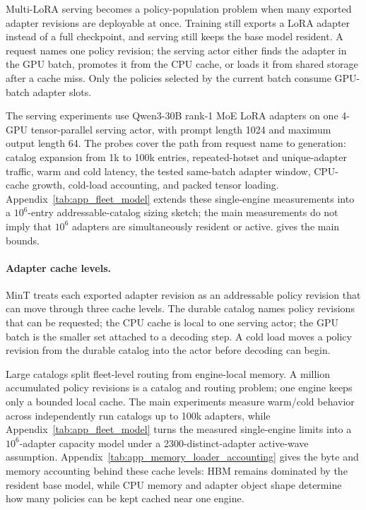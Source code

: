 \documentclass{llmxive}
\begin{document}
Multi-LoRA serving becomes a policy-population problem when many exported adapter revisions are deployable at once. Training still exports a LoRA adapter instead of a full checkpoint, and serving still keeps the base model resident. A request names one policy revision; the serving actor either finds the adapter in the GPU batch, promotes it from the CPU cache, or loads it from shared storage after a cache miss. Only the policies selected by the current batch consume GPU-batch adapter slots.

The serving experiments use Qwen3-30B rank-1 MoE LoRA adapters on one 4-GPU tensor-parallel serving actor, with prompt length 1024 and maximum output length 64. The probes cover the path from request name to generation: catalog expansion from 1k to 100k entries, repeated-hotset and unique-adapter traffic, warm and cold latency, the tested same-batch adapter window, CPU-cache growth, cold-load accounting, and packed tensor loading. Appendix~\cref{tab:app_fleet_model} extends these single-engine measurements into a $10^6$-entry addressable-catalog sizing sketch; the main measurements do not imply that $10^6$ adapters are simultaneously resident or active.  gives the main bounds.

\paragraph{Adapter cache levels.}
MinT treats each exported adapter revision as an addressable policy revision that can move through three cache levels. The durable catalog names policy revisions that can be requested; the CPU cache is local to one serving actor; the GPU batch is the smaller set attached to a decoding step. A cold load moves a policy revision from the durable catalog into the actor before decoding can begin.

Large catalogs split fleet-level routing from engine-local memory. A million accumulated policy revisions is a catalog and routing problem; one engine keeps only a bounded local cache. The main experiments measure warm/cold behavior across independently run catalogs up to 100k adapters, while Appendix~\cref{tab:app_fleet_model} turns the measured single-engine limits into a $10^6$-adapter capacity model under a 2300-distinct-adapter active-wave assumption. Appendix~\cref{tab:app_memory_loader_accounting} gives the byte and memory accounting behind these cache levels: HBM remains dominated by the resident base model, while CPU memory and adapter object shape determine how many policies can be kept cached near one engine.
\end{document}
